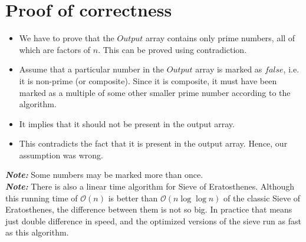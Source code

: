 \documentclass[11pt]{article}
\begin{document}
\section{Proof of correctness}
\begin{itemize}
\item We have to prove that the $Output$ array contains only prime numbers, all of which are factors of $n$. This can be proved using contradiction.
\item Assume that a particular number in the $Output$ array is marked as $false$, i.e. it is non-prime (or composite). Since it is composite, it must have been marked as a multiple of some other smaller prime number according to the algorithm.
\item It implies that it should not be present in the output array. \item This contradicts the fact that it is present in the output array. Hence, our assumption was wrong.\\
\end{itemize}
\textit{\textbf{Note: }}Some numbers may be marked more than once.\\
\textit{\textbf{Note: }}There is also a linear time algorithm for Sieve of Eratosthenes. Although this running time of $\mathcal{O}(n)$ is better than $\mathcal{O}(n\log\log n)$ of the classic Sieve of Eratosthenes, the difference between them is not so big. In practice that means just double difference in speed, and the optimized versions of the sieve run as fast as this algorithm.




\end{document}
